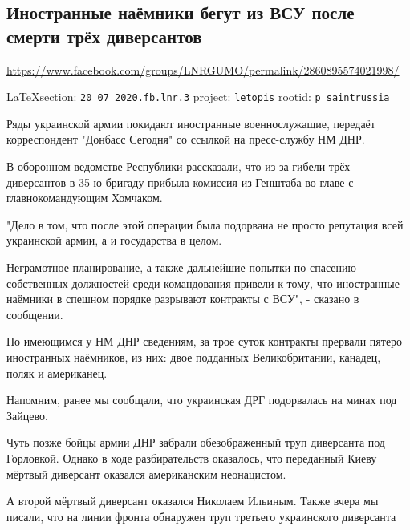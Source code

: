  
 
\subsection{Иностранные наёмники бегут из ВСУ после смерти трёх диверсантов}
\label{sec:20_07_2020.fb.lnr.3}
\url{https://www.facebook.com/groups/LNRGUMO/permalink/2860895574021998/}
  
\vspace{0.5cm}
{\small\LaTeX section: \verb|20_07_2020.fb.lnr.3| project: \verb|letopis| rootid: \verb|p_saintrussia|}
\vspace{0.5cm}

Ряды украинской армии покидают иностранные военнослужащие, передаёт
корреспондент "Донбасс Сегодня" со ссылкой на пресс-службу НМ ДНР.

В оборонном ведомстве Республики рассказали, что из-за гибели трёх диверсантов
в 35-ю бригаду прибыла комиссия из Генштаба во главе с главнокомандующим
Хомчаком.

"Дело в том, что после этой операции была подорвана не просто репутация всей
украинской армии, а и государства в целом.

Неграмотное планирование, а также дальнейшие попытки по спасению собственных
должностей среди командования привели к тому, что иностранные наёмники в
спешном порядке разрывают контракты с ВСУ", - сказано в сообщении.

По имеющимся у НМ ДНР сведениям, за трое суток контракты прервали пятеро
иностранных наёмников, из них: двое подданных Великобритании, канадец, поляк и
американец.

Напомним, ранее мы сообщали, что украинская ДРГ подорвалась на минах под
Зайцево.

Чуть позже бойцы армии ДНР забрали обезображенный труп диверсанта под
Горловкой.  Однако в ходе разбирательств оказалось, что переданный Киеву
мёртвый диверсант оказался американским неонацистом.

А второй мёртвый диверсант оказался Николаем Ильиным.  Также вчера мы писали,
что на линии фронта обнаружен труп третьего украинского диверсанта
  
